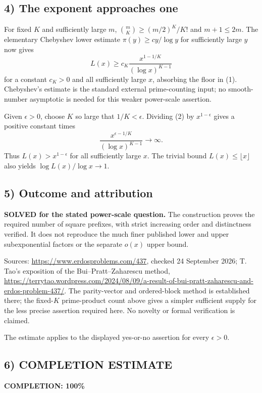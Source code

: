 \subsection*{4) The exponent approaches one}
For fixed $K$ and sufficiently large $m$, $\binom mK\ge(m/2)^K/K!$ and $m+1\le2m$. The elementary Chebyshev lower estimate $\pi(y)\ge c y/\log y$ for sufficiently large $y$ now gives
\[L(x)\ge c_K\frac{x^{1-1/K}}{(\log x)^{K-1}}\tag{2}\]
for a constant $c_K>0$ and all sufficiently large $x$, absorbing the floor in (1). Chebyshev's estimate is the standard external prime-counting input; no smooth-number asymptotic is needed for this weaker power-scale assertion.

Given $\epsilon>0$, choose $K$ so large that $1/K<\epsilon$. Dividing (2) by $x^{1-\epsilon}$ gives a positive constant times
\[\frac{x^{\epsilon-1/K}}{(\log x)^{K-1}}\longrightarrow\infty.
\]
Thus $L(x)>x^{1-\epsilon}$ for all sufficiently large $x$. The trivial bound $L(x)\le\lfloor x\rfloor$ also yields $\log L(x)/\log x\to1$.

\subsection*{5) Outcome and attribution}
\textbf{SOLVED for the stated power-scale question.} The construction proves the required number of square prefixes, with strict increasing order and distinctness verified. It does not reproduce the much finer published lower and upper subexponential factors or the separate $o(x)$ upper bound.

Sources: \url{https://www.erdosproblems.com/437}, checked 24 September 2026; T. Tao's exposition of the Bui--Pratt--Zaharescu method, \url{https://terrytao.wordpress.com/2024/08/09/a-result-of-bui-pratt-zaharescu-and-erdos-problem-437/}. The parity-vector and ordered-block method is established there; the fixed-$K$ prime-product count above gives a simpler sufficient supply for the less precise assertion required here. No novelty or formal verification is claimed.

The estimate applies to the displayed yes-or-no assertion for every $\epsilon>0$.
\subsection*{6) COMPLETION ESTIMATE}
\textbf{COMPLETION: 100\%}
